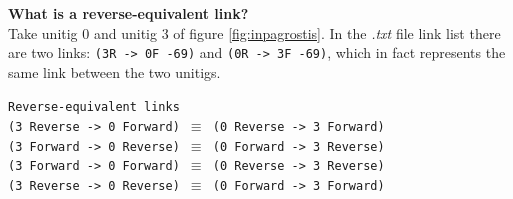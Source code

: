 \documentclass[12pt]{article}
\begin{document}
\textbf{What is a reverse-equivalent link?}\\ Take unitig 0 and unitig 3 of figure \ref{fig:inpagrostis}. In the \textit{.txt} file link list there are two links: \texttt{(3R -> 0F -69)} and \texttt{(0R -> 3F -69)}, which in fact represents the same link between the two unitigs. \\
\vspace{-0.7cm}
\begin{center}
\texttt{Reverse-equivalent links}\\
\texttt{(3 Reverse -> 0 Forward) $\equiv$ (0 Reverse -> 3 Forward)}\\
\texttt{(3 Forward -> 0 Reverse) $\equiv$ (0 Forward -> 3 Reverse)}\\
\texttt{(3 Forward -> 0 Forward) $\equiv$ (0 Reverse -> 3 Reverse)}\\
\texttt{(3 Reverse -> 0 Reverse) $\equiv$ (0 Forward ->  3 Forward)}\\
\vspace{-0.5cm}
\end{center}
\end{document}
